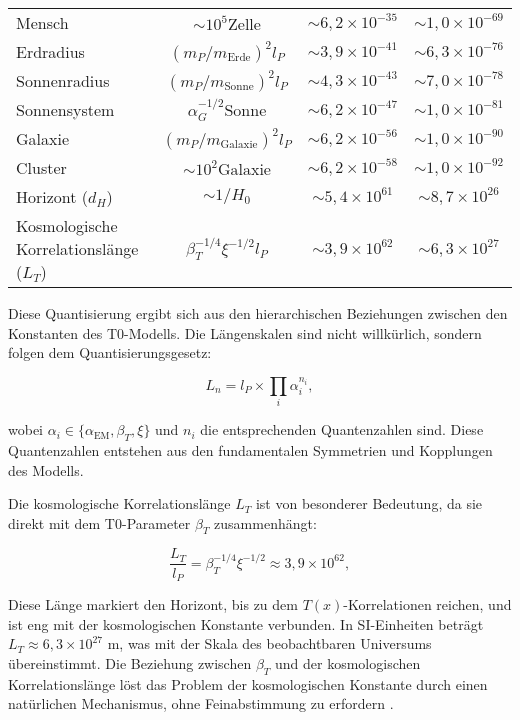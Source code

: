 \documentclass[twocolumn,aps,prl]{revtex4-2}
\begin{document}
\begin{table}[H]
{\begin{tabular}{lccc}
				Mensch & $\sim 10^5 \text{Zelle}$ & $\sim 6,2 \times 10^{-35}$ & $\sim 1,0 \times 10^{-69}$ \\
				Erdradius & $(m_P / m_{\text{Erde}})^2 l_P$ & $\sim 3,9 \times 10^{-41}$ & $\sim 6,3 \times 10^{-76}$ \\
				Sonnenradius & $(m_P / m_{\text{Sonne}})^2 l_P$ & $\sim 4,3 \times 10^{-43}$ & $\sim 7,0 \times 10^{-78}$ \\
				Sonnensystem & $\alpha_G^{-1/2} \text{Sonne}$ & $\sim 6,2 \times 10^{-47}$ & $\sim 1,0 \times 10^{-81}$ \\
				Galaxie & $(m_P / m_{\text{Galaxie}})^2 l_P$ & $\sim 6,2 \times 10^{-56}$ & $\sim 1,0 \times 10^{-90}$ \\
				Cluster & $\sim 10^2 \text{Galaxie}$ & $\sim 6,2 \times 10^{-58}$ & $\sim 1,0 \times 10^{-92}$ \\
				Horizont ($d_H$) & $\sim 1 / H_0$ & $\sim 5,4 \times 10^{61}$ & $\sim 8,7 \times 10^{26}$ \\
				Kosmologische Korrelationslänge ($L_T$) & $\beta_T^{-1/4} \xi^{-1/2} l_P$ & $\sim 3,9 \times 10^{62}$ & $\sim 6,3 \times 10^{27}$ \\
				\bottomrule
			\end{tabular}
		}
	\end{table}
	
	Diese Quantisierung ergibt sich aus den hierarchischen Beziehungen zwischen den Konstanten des T0-Modells. Die Längenskalen sind nicht willkürlich, sondern folgen dem Quantisierungsgesetz:
	
	\begin{equation}
		L_n = l_P \times \prod_i \alpha_i^{n_i}, \label{eq:detailed_quantization}
	\end{equation}
	
	wobei $\alpha_i \in \{\alpha_{\text{EM}}, \beta_T, \xi\}$ und $n_i$ die entsprechenden Quantenzahlen sind. Diese Quantenzahlen entstehen aus den fundamentalen Symmetrien und Kopplungen des Modells.
	
	Die kosmologische Korrelationslänge $L_T$ ist von besonderer Bedeutung, da sie direkt mit dem T0-Parameter $\beta_T$ zusammenhängt:
	
	\begin{equation}
		\frac{L_T}{l_P} = \beta_T^{-1/4} \xi^{-1/2} \approx 3,9 \times 10^{62}, \label{eq:correlation_length}
	\end{equation}
	
	Diese Länge markiert den Horizont, bis zu dem $T(x)$-Korrelationen reichen, und ist eng mit der kosmologischen Konstante verbunden. In SI-Einheiten beträgt $L_T \approx 6,3 \times 10^{27}$ m, was mit der Skala des beobachtbaren Universums übereinstimmt. Die Beziehung zwischen $\beta_T$ und der kosmologischen Korrelationslänge löst das Problem der kosmologischen Konstante durch einen natürlichen Mechanismus, ohne Feinabstimmung zu erfordern \cite{pascher_energiedynamik_2025}.
	
\end{document}
